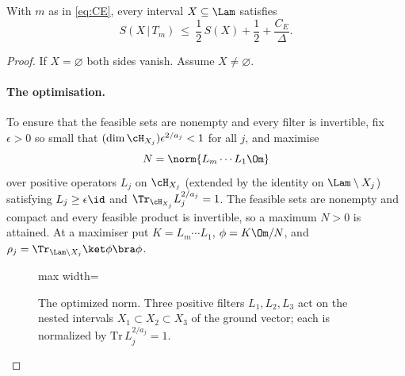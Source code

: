 \begin{lemma}\label{lem:buffer}
With $m$ as in \eqref{eq:CE}, every interval $X\subseteq\Lam$ satisfies
\begin{equation}\label{eq:discount}
 S(X\,|\,T_m)\ \le\ \frac12\,S(X)+\frac12+\frac{C_E}{\Delta}.
\end{equation}
\end{lemma}

\begin{proof}
If $X=\varnothing$ both sides vanish. Assume $X\ne\varnothing$.

\paragraph{The optimisation.}
To ensure that the feasible sets are nonempty and every filter is invertible,
fix $\epsilon>0$ so small that $(\dim\cH_{X_j})\epsilon^{2/a_j}<1$ for all
$j$, and maximise
\[
 N=\norm{L_m\cdots L_1\Om}
\]
over positive operators $L_j$ on $\cH_{X_j}$ (extended by the identity on
$\Lam\setminus X_j$) satisfying $L_j\ge\epsilon\id$ and
$\Tr_{\cH_{X_j}}L_j^{2/a_j}=1$. The feasible sets are nonempty and compact
and every feasible product is invertible, so a maximum $N>0$ is attained.
At a maximiser put $K=L_m\cdots L_1$, $\phi=K\Om/N$, and
$\rho_j=\Tr_{\Lam\setminus X_j}\ket\phi\bra\phi$.

\begin{figure}[t]
\centering
\begin{adjustbox}{max width=\linewidth}

\end{adjustbox}
\caption{The optimized norm. Three positive filters $L_1,L_2,L_3$ act on the nested intervals $X_1\subset X_2\subset X_3$ of the ground vector; each is normalized by $\mathrm{Tr}\,L_j^{2/a_j}=1$.}\label{fig:filter-product}
\end{figure}


\end{proof}
